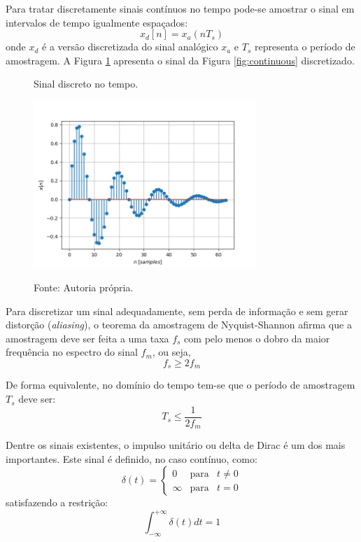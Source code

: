 \documentclass[12pt,a4paper]{report}
\begin{document}
  Para tratar discretamente sinais contínuos no tempo pode-se amostrar o sinal em intervalos de tempo igualmente
  espaçados:
  \begin{equation}
    x_d[n] = x_a(n T_s)
  \end{equation}
  onde $x_d$ é a versão discretizada do sinal analógico $x_a$ e $T_s$ representa o período de amostragem.
  A Figura \ref{fig:discrete} apresenta o sinal da Figura \ref{fig:continuous} discretizado.
  \begin{figure}[H]
    \caption{Sinal discreto no tempo.}
    \centering
    \includegraphics[width=0.75\textwidth]{discrete}
    \label{fig:discrete}
    \caption*{Fonte: Autoria própria.}
  \end{figure}

  Para discretizar um sinal adequadamente, sem perda de informação e sem gerar distorção (\textit{aliasing}), o
  teorema da amostragem de Nyquist-Shannon \cite{lathi} afirma que a amostragem deve ser feita a uma taxa $f_s$
  com pelo menos o dobro da maior frequência no espectro do sinal $f_m$, ou seja,
  \begin{equation}
    f_s \geq 2 f_m
  \end{equation}

  De forma equivalente, no domínio do tempo tem-se que o período de amostragem $T_s$ deve ser:
  \begin{equation}
    T_s  \leq \frac{1}{2 f_m}
  \end{equation}

  Dentre os sinais existentes, o impulso unitário ou delta de Dirac é um dos mais importantes. Este sinal é
  definido, no caso contínuo, como:
  \begin{equation}
    \delta(t) =
      \left
      \{
      \begin{array}{rcl}
        0 & \mbox{para} & t \neq 0 \\
        \infty & \mbox{para} & t = 0
      \end{array}
      \right.
  \end{equation}
  satisfazendo a restrição:
  \begin{equation}
    \int_{-\infty}^{+\infty} \delta(t) dt = 1
  \end{equation}
\end{document}
